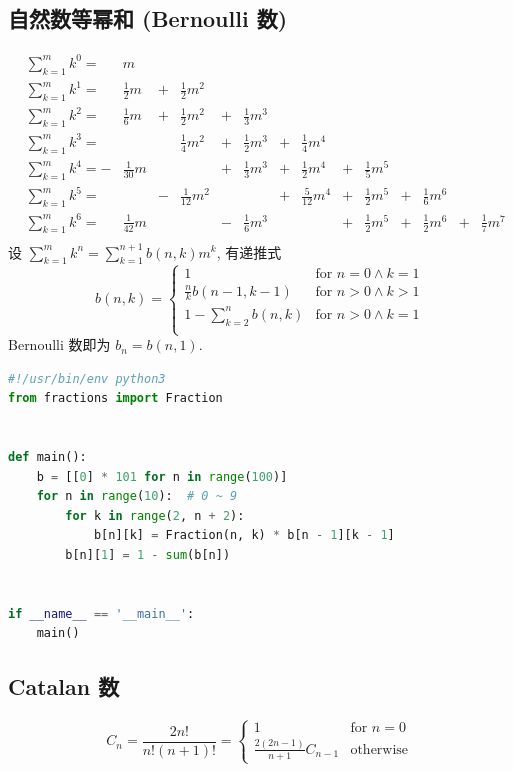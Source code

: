 \subsection{自然数等幂和 (Bernoulli 数)}
\[
  \begin{alignedat}{8}
    &\sum_{k=1}^mk^0=&m\\
    &\sum_{k=1}^mk^1=&\frac12m&+&\frac12m^2\\
    &\sum_{k=1}^mk^2=&\frac16m&+&\frac12m^2&+&\frac13m^3\\
    &\sum_{k=1}^mk^3=&&&\frac14m^2&+&\frac12m^3&+&\frac14m^4\\
    &\sum_{k=1}^mk^4=-&\frac1{30}m&&&+&\frac13m^3&+&\frac12m^4&+&\frac15m^5\\
    &\sum_{k=1}^mk^5=&&-&\frac1{12}m^2&&&+&\frac5{12}m^4&+&\frac12m^5&+&\frac16m^6\\
    &\sum_{k=1}^mk^6=&\frac1{42}m&&&-&\frac16m^3&&&+&\frac12m^5&+&\frac12m^6&+&\frac17m^7\\
  \end{alignedat}
\]
设 $\displaystyle\sum_{k=1}^mk^n=\sum_{k=1}^{n+1}b(n,k)m^k$, 有递推式
\[
  b(n,k)=\begin{cases}
    1&\text{for }n=0\land k=1\\
    \displaystyle\frac nkb(n-1,k-1)&\text{for }n>0\land k>1\\
    \displaystyle1-\sum_{k=2}^nb(n,k)&\text{for }n>0\land k=1\\
  \end{cases}
\]
Bernoulli 数即为 $b_n=b(n,1)$.

\begin{lstlisting}[language=Python]
#!/usr/bin/env python3
from fractions import Fraction


def main():
    b = [[0] * 101 for n in range(100)]
    for n in range(10):  # 0 ~ 9
        for k in range(2, n + 2):
            b[n][k] = Fraction(n, k) * b[n - 1][k - 1]
        b[n][1] = 1 - sum(b[n])


if __name__ == '__main__':
    main()
\end{lstlisting}

\clearpage
\subsection{Catalan 数}
\[
  C_n=\frac{2n!}{n!(n+1)!}=\begin{cases}
    1&\text{for }n=0\\
    \displaystyle\frac{2(2n-1)}{n+1}C_{n-1}&\text{otherwise}
  \end{cases}
\]
